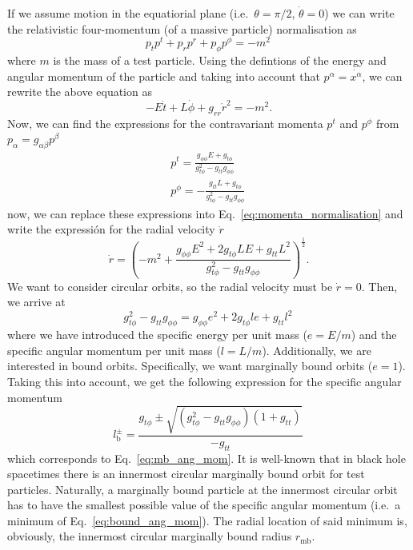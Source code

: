 \documentclass[twocolumn,aps,showpacs,showkeys,prd,superscriptaddress,byrevtex, amsmath]{revtex4-1}
\begin{document}
\begin{appendix}
If we assume motion in the equatiorial plane (i.e.~$\theta = \pi/2$, $\dot{\theta} = 0$) we can write the relativistic four-momentum (of a massive particle) normalisation as
\begin{equation}\label{eq:momenta_normalisation}
p_{t}p^t + p_{r}p^r + p_{\phi}p^{\phi} = -m^2\,
\end{equation}
where $m$ is the mass of a test particle. Using the defintions of the energy and angular momentum of the particle and taking into account that $p^{\alpha} = \dot{x^{\alpha}}$, we can rewrite the above equation as
\begin{equation}
-E \dot{t} + L \dot{\phi} + g_{rr} \dot{r}^2 = -m^2.
\end{equation}
Now, we can find the expressions for the contravariant momenta $p^{t}$ and $p^{\phi}$ from $p_{\alpha} = g_{\alpha \beta}p^{\beta}$
\begin{eqnarray}
p^{t} = \frac{g_{\phi\phi}E + g_{t\phi}}{g_{t\phi}^2-g_{tt}g_{\phi\phi}}
\\
p^{\phi} = -\frac{g_{tt}L+g_{t\phi}}{g_{t\phi}^2-g_{tt}g_{\phi\phi}}\,
\end{eqnarray}
now, we can replace these expressions into Eq.~\eqref{eq:momenta_normalisation} and write the expressión for the radial velocity $\dot{r}$
\begin{equation}\label{eq:radial_velocity}
\dot{r} = \left(-m^2+\frac{g_{\phi\phi}E^2+2 g_{t\phi}LE+g_{tt}L^2}{g_{t\phi}^2-g_{tt}g_{\phi\phi}}\right)^{\frac{1}{2}}.
\end{equation}
We want to consider circular orbits, so the radial velocity must be $\dot{r} = 0$. Then, we arrive at
\begin{equation}
g_{t\phi}^2-g_{tt}g_{\phi\phi} = g_{\phi\phi}e^2+2 g_{t\phi}le+g_{tt}l^2\,
\end{equation}
where we have introduced the specific energy per unit mass ($e = E/m$) and the specific angular momentum per unit mass ($l = L/m$). Additionally, we are interested in bound orbits. Specifically, we want marginally bound orbits ($e=1$). Taking this into account, we get the following expression for the specific angular momentum
\begin{equation}\label{eq:bound_ang_mom}
l^{\pm}_{\mathrm{b}} = \frac{g_{t\phi} \pm \sqrt{ (g_{t\phi}^2-g_{tt}g_{\phi\phi})  (1+g_{tt}) } }{-g_{tt}}\,
\end{equation}
which corresponds to Eq.~\eqref{eq:mb_ang_mom}. It is well-known that in black hole spacetimes there is an innermost circular marginally bound orbit for test particles. Naturally, a marginally bound particle at the innermost circular orbit has to have the smallest possible value of the specific angular momentum (i.e.~a minimum of Eq.~\eqref{eq:bound_ang_mom}). The radial location of said minimum is, obviously, the innermost circular marginally bound radius $r_{\mathrm{mb}}$.
\end{appendix}



\end{document}
